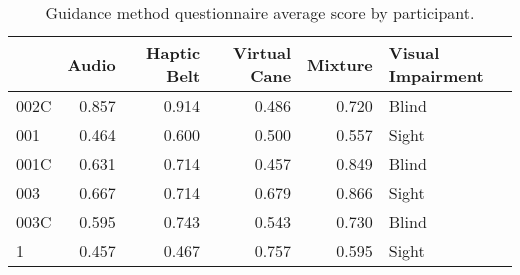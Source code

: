 
\begin{table}[!htb]
\centering
\caption{Guidance method questionnaire average score by participant.}
\label{tab:questionnaire_average}
\begin{tabular}{lrrrrl}
\toprule
{} &  Audio &  Haptic Belt &  Virtual Cane &  Mixture & Visual Impairment \\
\midrule
002C &  0.857 &        0.914 &         0.486 &    0.720 &             Blind \\
001  &  0.464 &        0.600 &         0.500 &    0.557 &             Sight \\
001C &  0.631 &        0.714 &         0.457 &    0.849 &             Blind \\
003  &  0.667 &        0.714 &         0.679 &    0.866 &             Sight \\
003C &  0.595 &        0.743 &         0.543 &    0.730 &             Blind \\
1    &  0.457 &        0.467 &         0.757 &    0.595 &             Sight \\
\bottomrule
\end{tabular}
\end{table}

